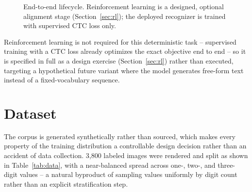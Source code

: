 \documentclass[10pt]{article}
\begin{document}
\begin{figure}[H]
\centering
{}
\caption{End-to-end lifecycle. Reinforcement learning is a designed, optional
alignment stage (Section~\ref{sec:rl}); the deployed recognizer is trained with
supervised CTC loss only.}
\label{fig:lifecycle}
\end{figure}

Reinforcement learning is not required for this deterministic task -- supervised
training with a CTC loss already optimizes the exact objective end to end -- so it is
specified in full as a design exercise (Section~\ref{sec:rl}) rather than executed,
targeting a hypothetical future variant where the model generates free-form text
instead of a fixed-vocabulary sequence.

\section{Dataset}

The corpus is generated synthetically rather than sourced, which makes every property
of the training distribution a controllable design decision rather than an accident of
data collection. 3{,}800 labeled images were rendered and split as shown in
Table~\ref{tab:data}, with a near-balanced spread across one-, two-, and three-digit
values -- a natural byproduct of sampling values uniformly by digit count rather than an
explicit stratification step.
\end{document}
